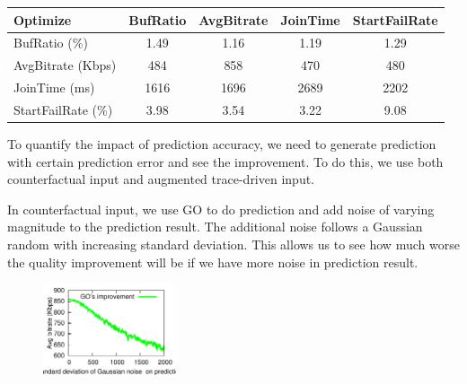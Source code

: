 \begin{table}[h!]
\begin{center}
\begin{small}
\begin{tabular}{l c c c c}
    Optimize             & BufRatio & AvgBitrate & JoinTime & StartFailRate \\ \hline
    BufRatio (\%)     & 1.49   & 1.16     & 1.19   & 1.29        \\ \hline
    AvgBitrate (Kbps)   & 484      & 858        & 470      & 480           \\ \hline
    JoinTime  (ms)    & 1616     & 1696       & 2689     & 2202          \\ \hline
    StartFailRate (\%) & 3.98   & 3.54     & 3.22   & 9.08        \\
\end{tabular}
\end{small}
\end{center}
\label{tab:cross-metrics}
\end{table}


\label{subsec:impact-accuracy}

To quantify the impact of prediction accuracy, we need to generate prediction with certain prediction error and see the improvement. To do this, we use both counterfactual input and augmented trace-driven input. 

In counterfactual input, we use GO to do prediction and add noise of varying magnitude to the prediction result. The additional noise follows a Gaussian random with increasing standard deviation.
This allows us to see how much worse the quality improvement will be if we have more noise in prediction result. 

\begin{figure}[h!]
\centering
 \includegraphics[width=0.35\textwidth] {figures/newfig/trendNoise-metricId1-keyGlobal-partition.pdf}
\label{fig:trace-accuracy-1}
\end{figure}

